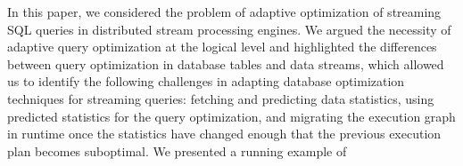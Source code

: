 \label {sec:fs-optimization-conclusion}
In this paper, we considered the problem of adaptive optimization of streaming SQL queries in distributed stream processing engines. We argued the necessity of adaptive query optimization at the logical level and highlighted the differences between query optimization in database tables and data streams, which allowed us to identify the following challenges in adapting database optimization techniques for streaming queries: fetching and predicting data statistics, using predicted statistics for the query optimization, and migrating the execution graph in runtime once the statistics have changed enough that the previous execution plan becomes suboptimal. We presented a running example of